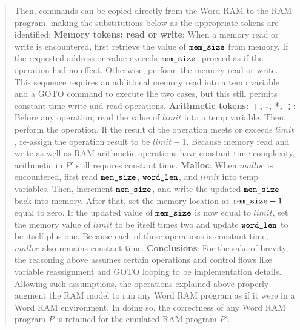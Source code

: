 \documentclass[11pt]{article}
\begin{document}
\begin{enumerate}
\begin{quote}
    \newline
    \newline 
    Then, commands can be copied directly from the Word RAM to the RAM program, making the substitutions below as the appropriate tokens are identified: 
    \newline
    \newline
    \textbf{Memory tokens: read or write}: \newline 
    When a memory read or write is encountered, first retrieve the value of $\texttt{mem\_size}$ from memory. If the requested address or value exceeds $\texttt{mem\_size}$, proceed as if the operation had no effect. Otherwise, perform the memory read or write. This sequence requires an additional memory read into a temp variable and a GOTO command to execute the two cases, but this still permits constant time write and read operations. \newline 
    \newline
    \textbf{Arithmetic tokens: +, -, *, ÷}: \newline
    Before any operation, read the value of $limit$ into a temp variable. Then, perform the operation. If the result of the operation meets or exceeds $limit$, re-assign the operation result to be $limit - 1$. Because memory read and write as well as RAM arithmetic operations have constant time complexity, arithmetic in $P'$ still requires constant time.
    \newline \newline
    \textbf{Malloc}: \newline
    When $malloc$ is encountered, first read $\texttt{mem\_size}$, $\texttt{word\_len}$, and $limit$ into temp variables. Then, increment $\texttt{mem\_size}$, and write the updated $\texttt{mem\_size}$ back into memory. After that, set the memory location at $\texttt{mem\_size} - 1$ equal to zero. If the updated value of $\texttt{mem\_size}$ is now equal to $limit$, set the memory value of $limit$ to be itself times two and update $\texttt{word\_len}$ to be itself plus one. Because each of these operations is constant time, $malloc$ also remains constant time.
    \newline
    \newline
    \textbf{Conclusions}: \newline
    For the sake of brevity, the reasoning above assumes certain operations and control flows like variable reassignment and GOTO looping to be implementation details. Allowing such assumptions, the operations explained above properly augment the RAM model to run any Word RAM program as if it were in a Word RAM environment. In doing so, the correctness of any Word RAM program $P$ is retained for the emulated RAM program $P'$.

\end{quote}
\end{enumerate}
\end{document}
